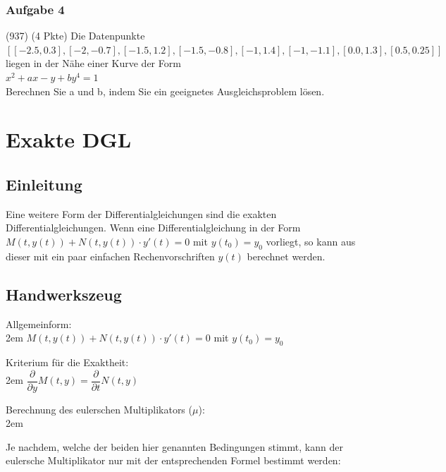 \documentclass[11pt,final]{scrreprt}
\newcommand{\br} {\medskip\\}
\newcommand{\gbr} {\bigskip\\}
\begin{document}
\subsection{Aufgabe 4} (937) (4 Pkte)
Die Datenpunkte\\
$[[-2.5, 0.3], [-2, -0.7], [-1.5, 1.2], [-1.5, -0.8], [-1, 1.4], [-1, -1.1], [0.0, 1.3], [0.5, 0.25]]$\\
liegen in der Nähe einer Kurve der Form\br
$x^2 + ax - y + by^4 = 1$\br
Berechnen Sie a und b, indem Sie ein geeignetes Ausgleichsproblem lösen.\gbr


\chapter{Exakte DGL}

\section{Einleitung}
Eine weitere Form der Differentialgleichungen sind die exakten Differentialgleichungen. Wenn eine Differentialgleichung in der Form $ M(t, y(t)) + N(t, y(t)) \cdot y'(t) = 0 $ mit $ y(t_0) = y_0$ vorliegt, so kann aus dieser mit ein paar einfachen Rechenvorschriften $y(t)$ berechnet werden.\\
\section{Handwerkszeug}

Allgemeinform:\\

\begingroup
\leftskip2em 
$ M(t, y(t)) + N(t, y(t)) \cdot y'(t) = 0 $ mit $ y(t_0) = y_0$\\
\par	
\endgroup 

Kriterium für die Exaktheit:\\

\begingroup
\leftskip2em 
$\dfrac{\partial}{\partial y}M(t, y) = \dfrac{\partial}{\partial t} N(t, y)$\\
\par	
\endgroup 

Berechnung des eulerschen Multiplikators ($\mu$):\\

\begingroup
\leftskip2em 

Je nachdem, welche der beiden hier genannten Bedingungen stimmt, kann der eulersche Multiplikator nur mit der entsprechenden Formel bestimmt werden:\br
\end{document}
